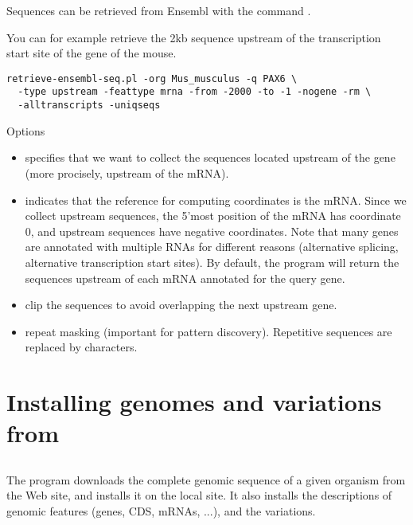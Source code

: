 Sequences can be retrieved from Ensembl with the command
. 

You can for example retrieve the 2kb sequence upstream of the
transcription start site of the gene  of the mouse. 

\begin{lstlisting}
retrieve-ensembl-seq.pl -org Mus_musculus -q PAX6 \
  -type upstream -feattype mrna -from -2000 -to -1 -nogene -rm \
  -alltranscripts -uniqseqs
\end{lstlisting}

Options

\begin{itemize}

\item {} specifies that we want to collect the
  sequences located upstream of the gene (more procisely, upstream of
  the mRNA).

\item {} indicates that the reference for computing
  coordinates is the mRNA. Since we collect upstream sequences, the
  5'most position of the mRNA has coordinate 0, and upstream sequences
  have negative coordinates. Note that many genes are annotated with
  multiple RNAs for different reasons (alternative splicing,
  alternative transcription start sites). By default, the program will
  return the sequences upstream of each mRNA annotated for the query
  gene.

\item {} clip the sequences to avoid overlapping the next
  upstream gene.

\item {} repeat masking (important for pattern
  discovery). Repetitive sequences are replaced by  characters.

\end{itemize} 


\section{Installing genomes and variations from \ensembl}

\subsection{}

The program \program{install-ensembl-genome} downloads the complete
genomic sequence of a given organism from the \ensembl Web site, and
installs it on the local \RSAT site. It also installs the descriptions
of genomic features (genes, CDS, mRNAs, ...), and the variations.

